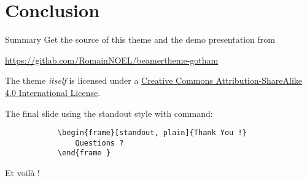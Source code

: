 \documentclass[aspectratio=169]{beamer}
\begin{document}
\section{Conclusion}

	\begin{frame}{Summary}
		Get the source of this theme and the demo presentation from

		\begin{center}\url{https://gitlab.com/RomainNOEL/beamertheme-gotham}\end{center}

		The theme \emph{itself} is licensed under a \href{http://creativecommons.org/licenses/by-sa/4.0/}{Creative Commons Attribution-ShareAlike 4.0 International License}.
		\begin{center} \ccbysa \end{center}
	\end{frame}

   \begin{standoutenv}
   \begin{frame}[fragile]
      The final slide using the standout style with command:
		\begin{verbatim}
			\begin{frame}[standout, plain]{Thank You !}
				Questions ?
		 	\end{frame }
		\end{verbatim}

		\begin{center}
			Et voilà !
		\end{center}
   \end{frame}
   \end{standoutenv}
	
\end{document}
